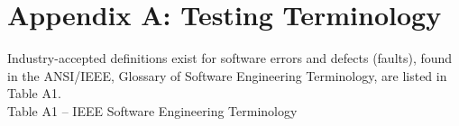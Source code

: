 
\section*{Appendix A:  Testing Terminology}

Industry-accepted definitions exist for software errors and defects (faults), found in the ANSI/IEEE, 
Glossary of Software Engineering Terminology, are
listed in Table A1. \\

Table A1 -- IEEE Software Engineering Terminology \cite{ieee} \\

